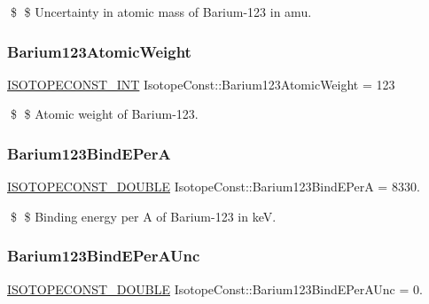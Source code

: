 \$ \$ Uncertainty in atomic mass of Barium-\/123 in amu. \mbox{\label{group___isotope_const-_barium-_ba123_gafa4c5d3ec3ad05ae329e857c1d85517e}} 
\subsubsection{\texorpdfstring{Barium123\+Atomic\+Weight}{Barium123AtomicWeight}}
{\footnotesize\ttfamily \mbox{\hyperlink{group___isotope_const-_macros_ga5f18360b3e99483a35c32d789e62621c}{I\+S\+O\+T\+O\+P\+E\+C\+O\+N\+S\+T\+\_\+\+I\+NT}} Isotope\+Const\+::\+Barium123\+Atomic\+Weight = 123}

\$ \$ Atomic weight of Barium-\/123. \mbox{\label{group___isotope_const-_barium-_ba123_ga37dea9f1f058a7848f7d319e538e6359}} 
\subsubsection{\texorpdfstring{Barium123\+Bind\+E\+PerA}{Barium123BindEPerA}}
{\footnotesize\ttfamily \mbox{\hyperlink{group___isotope_const-_macros_ga8f45a7272ce02c0b4c65c44636ed719a}{I\+S\+O\+T\+O\+P\+E\+C\+O\+N\+S\+T\+\_\+\+D\+O\+U\+B\+LE}} Isotope\+Const\+::\+Barium123\+Bind\+E\+PerA = 8330.}

\$ \$ Binding energy per A of Barium-\/123 in keV. \mbox{\label{group___isotope_const-_barium-_ba123_ga83003b0c7d58f2e2a860fb23d0482be8}} 
\subsubsection{\texorpdfstring{Barium123\+Bind\+E\+Per\+A\+Unc}{Barium123BindEPerAUnc}}
{\footnotesize\ttfamily \mbox{\hyperlink{group___isotope_const-_macros_ga8f45a7272ce02c0b4c65c44636ed719a}{I\+S\+O\+T\+O\+P\+E\+C\+O\+N\+S\+T\+\_\+\+D\+O\+U\+B\+LE}} Isotope\+Const\+::\+Barium123\+Bind\+E\+Per\+A\+Unc = 0.}

